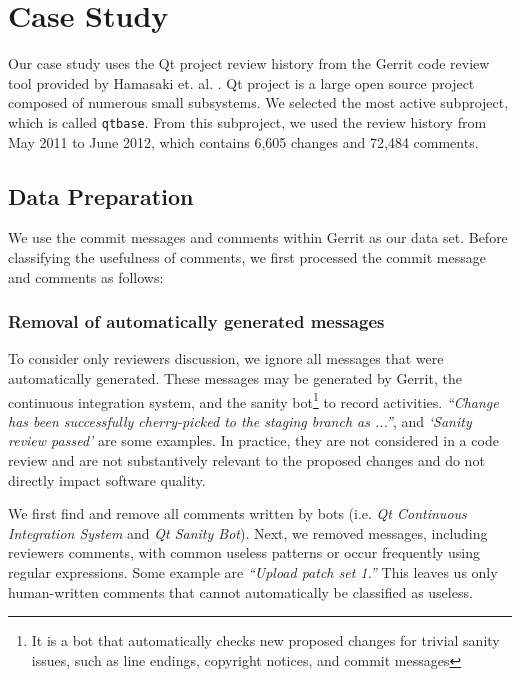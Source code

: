 
\section{Case Study}

Our case study uses the Qt project review history from the Gerrit code review tool provided by Hamasaki et. al. \cite{Hamasaki2013}. Qt project is a large open source project composed of numerous small subsystems. We selected the most active subproject, which is called \texttt{qtbase}.
From this subproject, we used the review history from May 2011 to June 2012, which contains 6,605 changes and 72,484 comments.


\subsection{Data Preparation}
We use the commit messages and comments within Gerrit as our data set.
Before classifying the usefulness of comments, we first processed the commit message and comments as follows: 

\subsubsection{Removal of automatically generated messages} To consider only reviewers discussion, we ignore all messages that were automatically generated. %
These messages may be generated by Gerrit, the continuous integration system, and the sanity bot\footnote{It is a bot that automatically checks new proposed changes for trivial sanity issues, such as line endings, copyright notices, and commit messages} to record activities. \textit{``Change has been successfully cherry-picked to the staging branch as ...''}, and \textit{`Sanity review passed'} are some examples. In practice, they are not considered in a code review  and are not substantively relevant to the proposed changes and do not directly impact software quality\cite{Mcintosh}. 

We first find and remove all comments written by bots (i.e. \emph{Qt Continuous Integration System} and \emph{Qt Sanity Bot}).
Next, we removed messages, including reviewers comments, with common useless patterns or occur frequently using regular expressions. Some example are \textit{``Upload patch set 1.''}
This leaves us only human-written comments that cannot automatically be classified as useless.

